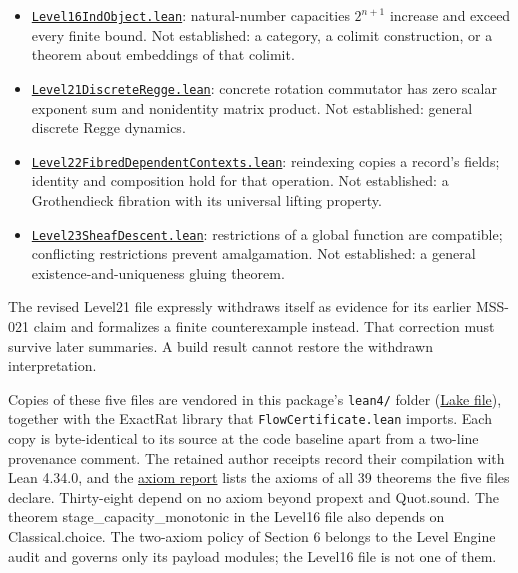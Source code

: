 \documentclass[
  11pt,
]{article}
\newcommand{\passthrough}[1]{#1}
\providecommand{\tightlist}{%
  \setlength{\itemsep}{0pt}\setlength{\parskip}{0pt}}
\begin{document}
\begin{itemize}
\tightlist
\item
  \href{https://github.com/dbccpage/the_symbol_game/blob/52cb5457f6c485ba548cfd292f6012a941ed22cf/lean4/Level16IndObject.lean}{\mbox{\nolinkurl{Level16IndObject.lean}}}:
  natural-number capacities \(2^{n+1}\) increase and exceed every finite
  bound. Not established: a category, a colimit construction, or a
  theorem about embeddings of that colimit.
\item
  \href{https://github.com/dbccpage/the_symbol_game/blob/52cb5457f6c485ba548cfd292f6012a941ed22cf/lean4/Level21DiscreteRegge.lean}{\mbox{\nolinkurl{Level21DiscreteRegge.lean}}}:
  concrete rotation commutator has zero scalar exponent sum and
  nonidentity matrix product. Not established: general discrete Regge
  dynamics.
\item
  \href{https://github.com/dbccpage/the_symbol_game/blob/52cb5457f6c485ba548cfd292f6012a941ed22cf/lean4/Level22FibredDependentContexts.lean}{\mbox{\nolinkurl{Level22FibredDependentContexts.lean}}}:
  reindexing copies a record's fields; identity and composition hold for
  that operation. Not established: a Grothendieck fibration with its
  universal lifting property.
\item
  \href{https://github.com/dbccpage/the_symbol_game/blob/52cb5457f6c485ba548cfd292f6012a941ed22cf/lean4/Level23SheafDescent.lean}{\mbox{\nolinkurl{Level23SheafDescent.lean}}}:
  restrictions of a global function are compatible; conflicting
  restrictions prevent amalgamation. Not established: a general
  existence-and-uniqueness gluing theorem.
\end{itemize}

The revised Level21 file expressly withdraws itself as evidence for its
earlier MSS-021 claim and formalizes a finite counterexample instead.
That correction must survive later summaries. A build result cannot
restore the withdrawn interpretation.

Copies of these five files are vendored in this package's
\passthrough{\lstinline!lean4/!} folder
(\href{https://github.com/dbccpage/the_symbol_game/blob/main/omega_engine_education/documentation/030_pfp_proposal_fidelity_protocol_pfp/papers/omega_engine_symbol_game/008_pfp_mssn_tower_challenges_and_retraction_benchmarks/lean4/lakefile.lean}{Lake
file}), together with the ExactRat library that
\mbox{\nolinkurl{FlowCertificate.lean}} imports. Each copy is
byte-identical to its source at the code baseline apart from a two-line
provenance comment. The retained author receipts record their
compilation with Lean 4.34.0, and the
\href{https://github.com/dbccpage/the_symbol_game/blob/main/omega_engine_education/documentation/030_pfp_proposal_fidelity_protocol_pfp/papers/omega_engine_symbol_game/008_pfp_mssn_tower_challenges_and_retraction_benchmarks/lean4/axiom_report.txt}{axiom
report} lists the axioms of all 39 theorems the five files declare.
Thirty-eight depend on no axiom beyond propext and Quot.sound. The
theorem stage\_capacity\_monotonic in the Level16 file also depends on
Classical.choice. The two-axiom policy of Section 6 belongs to the Level
Engine audit and governs only its payload modules; the Level16 file is
not one of them.
\end{document}
